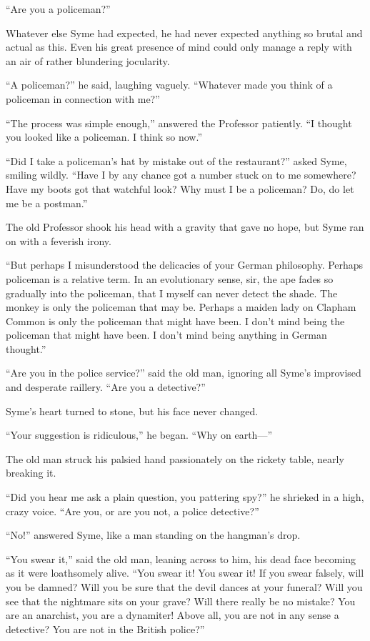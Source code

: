 “Are you a policeman?”

Whatever else Syme had expected, he had never expected anything so brutal and actual as this. Even his great presence of mind could only manage a reply with an air of rather blundering jocularity.

“A policeman?” he said, laughing vaguely. “Whatever made you think of a policeman in connection with me?”

“The process was simple enough,” answered the Professor patiently. “I thought you looked like a policeman. I think so now.”

“Did I take a policeman’s hat by mistake out of the restaurant?” asked Syme, smiling wildly. “Have I by any chance got a number stuck on to me somewhere? Have my boots got that watchful look? Why must I be a policeman? Do, do let me be a postman.”

The old Professor shook his head with a gravity that gave no hope, but Syme ran on with a feverish irony.

“But perhaps I misunderstood the delicacies of your German philosophy. Perhaps policeman is a relative term. In an evolutionary sense, sir, the ape fades so gradually into the policeman, that I myself can never detect the shade. The monkey is only the policeman that may be. Perhaps a maiden lady on Clapham Common is only the policeman that might have been. I don’t mind being the policeman that might have been. I don’t mind being anything in German thought.”

“Are you in the police service?” said the old man, ignoring all Syme’s improvised and desperate raillery. “Are you a detective?”

Syme’s heart turned to stone, but his face never changed.

“Your suggestion is ridiculous,” he began. “Why on earth⁠—”

The old man struck his palsied hand passionately on the rickety table, nearly breaking it.

“Did you hear me ask a plain question, you pattering spy?” he shrieked in a high, crazy voice. “Are you, or are you not, a police detective?”

“No!” answered Syme, like a man standing on the hangman’s drop.

“You swear it,” said the old man, leaning across to him, his dead face becoming as it were loathsomely alive. “You swear it! You swear it! If you swear falsely, will you be damned? Will you be sure that the devil dances at your funeral? Will you see that the nightmare sits on your grave? Will there really be no mistake? You are an anarchist, you are a dynamiter! Above all, you are not in any sense a detective? You are not in the British police?”

